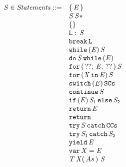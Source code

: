 \documentclass[a4paper,oneside]{article}
\begin{document}
\newcommand{\ExpressionStatement}[1]{\{\, #1\, \}}
\newcommand{\Block}[1]{#1\, \statementmeta*}
\newcommand{\EmptyStatement}{\{\}}

\newcommand{\LabeledStatement}[2]{#1:\, #2}
\newcommand{\BreakStatement}[1]{\tt{break}\, #1}
\newcommand{\WhileStatement}[2]{\tt{while}\, (#1)\, #2}
\newcommand{\DoStatement}[2]{\tt{do}\, #1\, \tt{while}\, (#2)}
\newcommand{\ForStatement}[4]{\tt{for}\, (\,#1;\, #2;\, #3\,)\, #4}
\newcommand{\ForInStatement}[3]{\tt{for}\,(#1\,\tt{in}\,#2)\,#3}

\newcommand{\SwitchStatement}[2]{\tt{switch}\,(#1)\,#2}
\newcommand{\ContinueSwitchStatement}[1]{\tt{continue}\,#1}
\newcommand{\IfStatement}[3]{\tt{if}\,(#1)\,#2\,\tt{else}\,#3}
\newcommand{\ReturnStatement}[1]{\tt{return}\,#1}

\newcommand{\TryCatch}[2]{\tt{try}\,#1\,\tt{catch}\,#2}
\newcommand{\TryFinally}[2]{\tt{try}\,#1\,\tt{catch}\,#2}

\newcommand{\Yield}[1]{\tt{yield}\,#1}

\newcommand{\VarDeclaration}[2]{\tt{var}\,#1=#2}
\newcommand{\FunctionDeclaration}[5]{#1\,#2(\,#3\,)\,#4\,#5}

\[
\begin{array}{rl}

  \statementmeta \in \mathit{Statements} ::=
  & \ExpressionStatement{\expressionmeta} \\
  & \Block{\statementmeta} \\
  & \EmptyStatement \\
  & \LabeledStatement{\labelmeta}{\statementmeta} \\
  & \BreakStatement{\labelmeta} \\
  & \WhileStatement{\expressionmeta}{\statementmeta} \\
  & \DoStatement{\statementmeta}{\expressionmeta} \\
  & \ForStatement{??}{\expressionmeta}{??}{\statementmeta} \\
  & \ForInStatement{\idmeta}{\expressionmeta}{\statementmeta} \\
  & \SwitchStatement{\expressionmeta}{\tt{SCs}} \\
  & \ContinueSwitchStatement{\statementmeta} \\
  & \IfStatement{\expressionmeta}{\statementmeta_1}{\statementmeta_2} \\
  & \ReturnStatement{\expressionmeta} \\
  & \ReturnStatement{} \\
  & \TryCatch{\statementmeta}{\tt{CCs}} \\
  & \TryFinally{\statementmeta_1}{\statementmeta_2} \\
  & \Yield{\expressionmeta} \\
  & \VarDeclaration{\idmeta}{\expressionmeta} \\
  & \FunctionDeclaration{\typemeta}{\idmeta}{\formals}{}{\stmt} \\

\end{array}
\]
\end{document}
